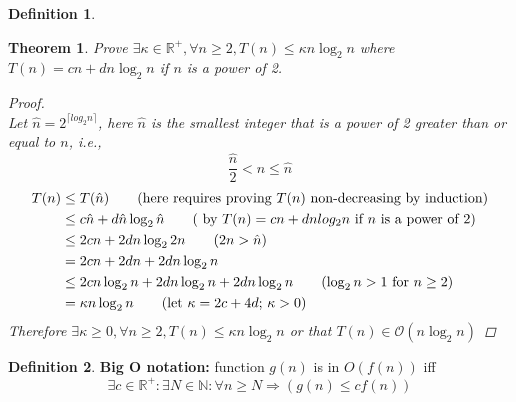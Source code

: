 \documentclass[11pt]{article}
\theoremstyle{plain}%
\newtheorem{theorem}{Theorem}[section]
\theoremstyle{definition}
\newtheorem{defn}{Definition}
\theoremstyle{remark}
\newcommand{\N}{\mathbb{N}}
\newcommand{\R}{\mathbb{R}}
\begin{document}
\begin{defn}
  \begin{theorem}
    \label{big O of mergesort proof}
    Prove $\exists \kappa\in\R^+, \forall n\geq 2, T(n)\leq \kappa n\log_2{n}$ where $T(n) = cn + dn\log_2{n}$ if $n$ is a power of 2.

    \begin{proof}
      $ $\\
      Let $\hat{n} = 2^{\lceil log_2{n}\rceil}$, here $\hat{n}$ is the smallest integer that is a power of 2 greater than or equal to $n$, i.e.,
      \[
        \frac{\hat{n}}{2} < n\leq \hat{n}
      \]
      \begin{align*}
        T(n) &\leq T(\hat{n}) \tag{here requires proving $T(n)$ non-decreasing by induction}\\
        &\leq c\hat{n} + d\hat{n}\log_2{\hat{n}} \tag{ by $T(n) = cn + dnlog_2{n}$ if $n$ is a power of 2}\\
        &\leq 2cn + 2dn\log_2{2n} \tag{$2n>\hat{n}$} \\
        &= 2cn + 2dn+ 2dn\log_2{n} \\
        &\leq 2cn\log_2{n} + 2dn\log_2{n} + 2dn\log_2{n} \tag{$\log_2{n} > 1$ for $n\geq 2$}\\
        &= \kappa n\log_2{n} \tag{let $\kappa = 2c+4d$; $\kappa > 0$}
      \end{align*}
      Therefore $\exists \kappa \geq 0, \forall n\geq 2, T(n)\leq\kappa n\log_2{n}$ or that $T(n)\in \mathcal{O}(n\log_2{n})$
    \end{proof}
  \end{theorem}
\end{defn}

\begin{defn}
  \label{big O}
  \textbf{Big O notation: } function $g(n)$ is in $O(f(n))$ iff
  \[
    \exists c\in \R^+: \exists N\in \N: \forall n\geq N \Rightarrow (g(n)\leq cf(n))
  \]
\end{defn}
\end{document}

